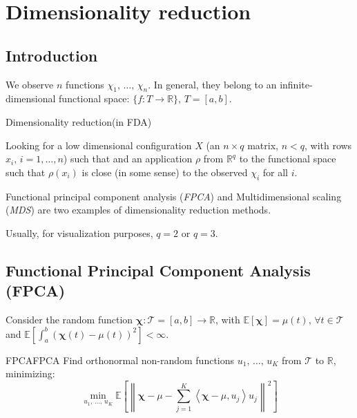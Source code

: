 \chapter{Dimensionality reduction}

\section{Introduction}
We observe $n$ functions $\chi_1,\, \dots,\, \chi_n$. In general,
they belong to an infinite-dimensional functional space:
$\{f: T \to \mathds R\},\,T = [a, b]$.
\begin{problem}{Dimensionality reduction}{}(in FDA)

Looking for a low dimensional configuration $X$
(an $n \times q$ matrix, $n < q$, with rows $x_i,\,i=1,\dots,n$) such that
and an application $\rho$ from $\mathds R^q$ to the functional space such
that $\rho(x_i)$ is close (in some sense) to the observed $\chi_i$ for all $i$.

\tcblower

Functional principal component analysis (\emph{FPCA}) and
Multidimensional scaling (\emph{MDS}) are two examples of dimensionality reduction methods.


\begin{note}
	Usually, for visualization purposes, $q=2$ or $q=3$.
\end{note}
\end{problem}

\pagebreak
\section{Functional Principal Component Analysis (FPCA)}

Consider the random function $\boldsymbol \chi : \mathcal T = [a, b] \to \mathds R$,
with $\mathds E [\boldsymbol \chi] = \mu(t),\, \forall t \in \mathcal T$ and
$\mathds E \left[ \int_a^b \left( \boldsymbol \chi(t) - \mu(t) \right)^2 \right] < \infty$.

\begin{problem}{FPCA}{FPCA}
Find orthonormal non-random functions $u_1,\, \dots,\, u_K$ from $\mathcal T$ to $\mathds R$,
minimizing:
\begin{equation*}
	\min_{u_1,\, \dots,\, u_K} \mathds E \left[
		\left\lVert
		\boldsymbol \chi - \mu - \sum_{j=1}^K \left\langle
		\boldsymbol \chi - \mu, u_j
		\right\rangle u_j
		\right\rVert^2
		\right]
\end{equation*}
\end{problem}

